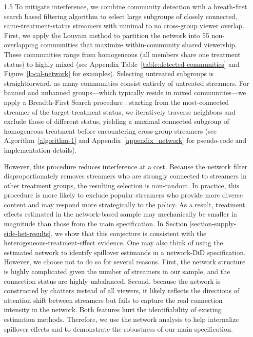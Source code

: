 \documentclass[a4paper,12pt]{article}
\begin{document}
\begin{spacing}{1.5}
To mitigate interference, we combine community detection with a breath-first search based filtering algorithm to select large subgroups of closely connected, same-treatment-status streamers with minimal to no cross-group viewer overlap. First, we apply the Louvain method \citep{blondel2008fast} to partition the network
into 55 non-overlapping communities that maximize within-community shared viewership. These communities range from homogeneous (all members share one
treatment status) to highly mixed (see Appendix Table~\ref{table:detected-communities} and Figure~\ref{local-network} for examples). Selecting untreated subgroups is straightforward, as many communities consist entirely of untreated streamers. For banned and unbanned groups---which typically reside in mixed communities---we apply a Breadth-First Search procedure \citep{moore1959shortest}: starting from the most-connected streamer of the target
treatment status, we iteratively traverse neighbors and exclude those of different status, yielding a maximal connected subgroup of homogeneous
treatment before encountering cross-group streamers (see Algorithm~\ref{algorithm-1} and Appendix~\ref{appendix_network} for pseudo-code and
implementation details).

However, this procedure reduces interference at a cost. Because the network filter disproportionately removes streamers who are strongly connected to streamers in other treatment groups, the resulting selection is non-random. In practice, this procedure is more likely to exclude popular streamers who provide more diverse content and may respond more strategically to the policy. As a result, treatment effects estimated in the network-based sample may mechanically be smaller in magnitude than those from the main specification. In Section \ref{section-supply-side-het-results}, we show that this conjecture is consistent with the heterogeneous-treatment-effect evidence. One may also think of using the estimated network to identify spillover estimands in a network-DiD specification. However, we choose not to do so for several reasons. First, the network structure is highly complicated given the number of streamers in our sample, and the connection status are highly unbalanced. Second, because the network is constructed by chatters instead of all viewers, it likely reflects the directions of attention shift between streamers but fails to capture the real connection intensity in the network. Both features hurt the identifiability of existing estimation methods. Therefore, we use the network analysis to help internalize spillover effects and to demonstrate the robustness of our main specification.


\end{spacing}
\end{document}
